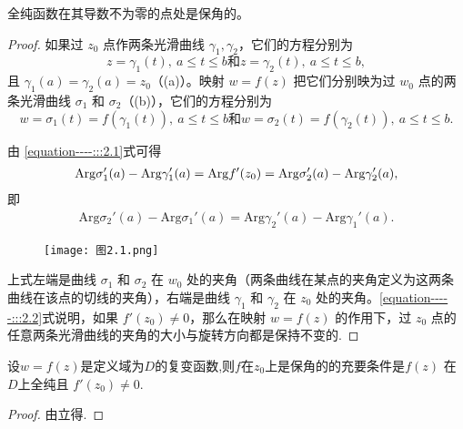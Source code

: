 \documentclass[../../main.tex]{subfiles}
\begin{document}
\begin{theorem}\label{theorem:全纯函数在其导数不为零的点处是保角的}
全纯函数在其导数不为零的点处是保角的。
\end{theorem}
\begin{proof}
如果过 \( z_0 \) 点作两条光滑曲线 \( \gamma_1, \gamma_2 \)，它们的方程分别为  
\[ z = \gamma_1(t),\ a \leqslant t \leqslant b \text{和}  
z = \gamma_2(t),\ a \leqslant t \leqslant b, \]  
且 \( \gamma_1(a) = \gamma_2(a) = z_0 \)（(a)）。映射 \( w = f(z) \) 把它们分别映为过 \( w_0 \) 点的两条光滑曲线 \( \sigma_1 \) 和 \( \sigma_2 \)（(b)），它们的方程分别为  
\[ w = \sigma_1(t) = f(\gamma_1(t)),\ a \leqslant t \leqslant b \text{和} w = \sigma_2(t) = f(\gamma_2(t)),\ a \leqslant t \leqslant b. \]  

由 \eqref{equation----:::2.1}式可得  
\begin{align}
\mathrm{Arg} \sigma_1'(a) - \mathrm{Arg} \gamma_1'(a) = \mathrm{Arg} f'(z_0) \notag = \mathrm{Arg} \sigma_2'(a) - \mathrm{Arg} \gamma_2'(a), \notag
\end{align}
即  
\begin{align}
\mathrm{Arg} \sigma_2'(a) - \mathrm{Arg} \sigma_1'(a) = \mathrm{Arg} \gamma_2'(a) - \mathrm{Arg} \gamma_1'(a). \label{equation-----:::2.2}
\end{align}
\begin{figure}[H]
\centering
\texttt{[image: 
图2.1.png]}
\caption{}
\label{figure:image-图2.1}
\end{figure}
上式左端是曲线 \( \sigma_1 \) 和 \( \sigma_2 \) 在 \( w_0 \) 处的夹角（两条曲线在某点的夹角定义为这两条曲线在该点的切线的夹角），右端是曲线 \( \gamma_1 \) 和 \( \gamma_2 \) 在 \( z_0 \) 处的夹角。\eqref{equation-----:::2.2}式说明，如果 \( f'(z_0) \neq 0 \)，那么在映射 \( w = f(z) \) 的作用下，过 \( z_0 \) 点的任意两条光滑曲线的夹角的大小与旋转方向都是保持不变的.

\end{proof}

\begin{corollary}
设\( w = f(z) \)是定义域为$D$的复变函数,则$f$在$z_0$上是保角的的充要条件是\( f(z) \) 在$D$上全纯且 \( f'(z_0) \neq 0 \).
\end{corollary}
\begin{proof}
由立得.

\end{proof}
\end{document}
